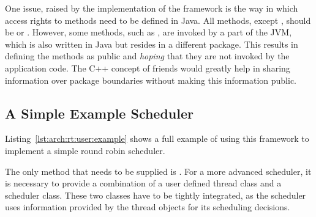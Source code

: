 One issue, raised by the implementation of the framework is the way
in which access rights to methods need to be defined in Java. All
methods, except , should be  or
. However, some methods, such as ,
are invoked by a part of the JVM, which is also written in Java but
resides in a different package. This results in defining the methods
as public and \emph{hoping} that they are not invoked by the
application code. The C++ concept of friends would greatly help in
sharing information over package boundaries without making this
information public.

\subsection{A Simple Example Scheduler}

Listing~\ref{lst:arch:rt:user:example} shows a full example of using
this framework to implement a simple round robin scheduler.

The only method that needs to be supplied is . For
a more advanced scheduler, it is necessary to provide a combination
of a user defined thread class and a scheduler class. These two
classes have to be tightly integrated, as the scheduler uses
information provided by the thread objects for its scheduling
decisions.

